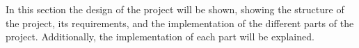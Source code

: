 In this section the design of the project will be shown, showing the structure of the project, its requirements, and the implementation of the different parts of the project. Additionally, the implementation of each part will be explained.